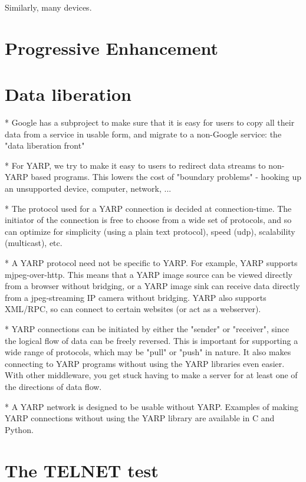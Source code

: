 \documentclass[letterpaper]{article}
\begin{document}
Similarly, many devices.

\section{Progressive Enhancement}

\section{Data liberation}

* Google has a subproject to make sure that it is easy for users to copy all their data from a service in usable form, and migrate to a non-Google service: the "data liberation front"

* For YARP, we try to make it easy to users to redirect data streams to non-YARP based programs.  This lowers the cost of "boundary problems" - hooking up an unsupported device, computer, network, ...

* The protocol used for a YARP connection is decided at connection-time.  The initiator of the connection is free to choose from a wide set of protocols, and so can optimize for simplicity (using a plain text protocol), speed (udp), scalability (multicast), etc.  

* A YARP protocol need not be specific to YARP.  For example, YARP supports mjpeg-over-http.  This means that a YARP image source can be viewed directly from a browser without bridging, or a YARP image sink can receive data directly from a jpeg-streaming IP camera without bridging.  YARP also supports XML/RPC, so can connect to certain websites (or act as a webserver).

* YARP connections can be initiated by either the "sender" or "receiver", since the logical flow of data can be freely reversed.  This is important for supporting a wide range of protocols, which may be "pull" or "push" in nature.  It also makes connecting to YARP programs without using the YARP libraries even easier.  With other middleware, you get stuck having to make a server for at least one of the directions of data flow.

* A YARP network is designed to be usable without YARP.  Examples of making YARP connections without using the YARP library are available in C and Python.


\section{The TELNET test}
\end{document}
